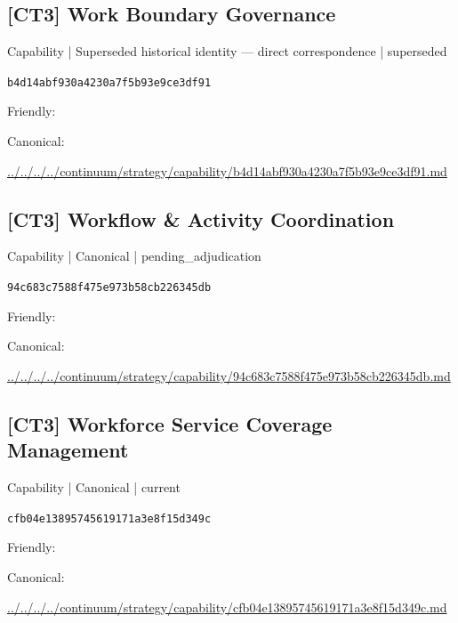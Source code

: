 \documentclass[10pt,a4paper]{article}
\begin{document}
\subsection*{[CT3] Work Boundary Governance}
{\small Capability | Superseded historical identity — direct correspondence | superseded}\par
\texttt{b4d14abf930a4230a7f5b93e9ce3df91}\par
Friendly: \par
Canonical: \par
{\footnotesize\url{../../../../continuum/strategy/capability/b4d14abf930a4230a7f5b93e9ce3df91.md}}\par
\subsection*{[CT3] Workflow \& Activity Coordination}
{\small Capability | Canonical | pending\_adjudication}\par
\texttt{94c683c7588f475e973b58cb226345db}\par
Friendly: \par
Canonical: \par
{\footnotesize\url{../../../../continuum/strategy/capability/94c683c7588f475e973b58cb226345db.md}}\par
\subsection*{[CT3] Workforce Service Coverage Management}
{\small Capability | Canonical | current}\par
\texttt{cfb04e13895745619171a3e8f15d349c}\par
Friendly: \par
Canonical: \par
{\footnotesize\url{../../../../continuum/strategy/capability/cfb04e13895745619171a3e8f15d349c.md}}\par
\end{document}
